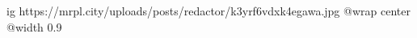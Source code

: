  
 
 
 
 

\ifcmt
  ig https://mrpl.city/uploads/posts/redactor/k3yrf6vdxk4egawa.jpg
  @wrap center
  @width 0.9
\fi
